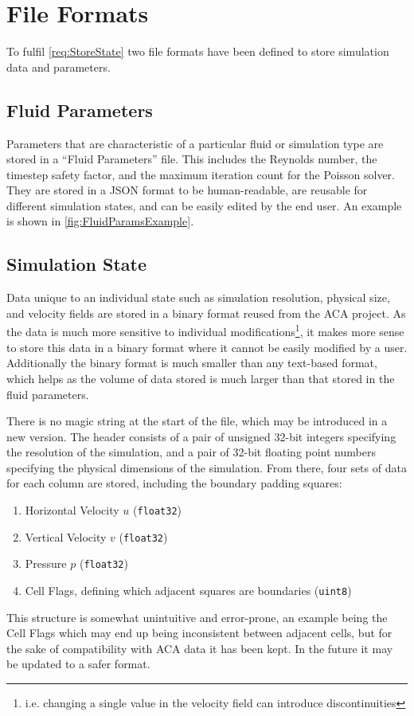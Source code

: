 \section{File Formats}
\label{sec:FileFormat}
To fulfil \cref{req:StoreState} two file formats have been defined to store simulation data and parameters.

\subsection{Fluid Parameters}
Parameters that are characteristic of a particular fluid or simulation type are stored in a ``Fluid Parameters'' file.
This includes the Reynolds number, the timestep safety factor, and the maximum iteration count for the Poisson solver.
They are stored in a JSON format to be human-readable, are reusable for different simulation states, and can be easily edited by the end user.
An example is shown in \cref{fig:FluidParamsExample}.



\subsection{Simulation State}
Data unique to an individual state such as simulation resolution, physical size, and velocity fields are stored in a binary format reused from the ACA project.
As the data is much more sensitive to individual modifications\footnote{i.e. changing a single value in the velocity field can introduce discontinuities}, it makes more sense to store this data in a binary format where it cannot be easily modified by a user.
Additionally the binary format is much smaller than any text-based format, which helps as the volume of data stored is much larger than that stored in the fluid parameters.


% 
There is no magic string at the start of the file, which may be introduced in a new version.
The header consists of a pair of unsigned 32-bit integers specifying the resolution of the simulation, and a pair of 32-bit floating point numbers specifying the physical dimensions of the simulation.
From there, four sets of data for each column are stored, including the boundary padding squares:
\begin{enumerate}
    \item Horizontal Velocity $u$ (\texttt{float32})
    \item Vertical Velocity $v$ (\texttt{float32})
    \item Pressure $p$ (\texttt{float32})
    \item Cell Flags, defining which adjacent squares are boundaries (\texttt{uint8})
\end{enumerate}
This structure is somewhat unintuitive and error-prone, an example being the Cell Flags which may end up being inconsistent between adjacent cells, but for the sake of compatibility with ACA data it has been kept.
In the future it may be updated to a safer format.